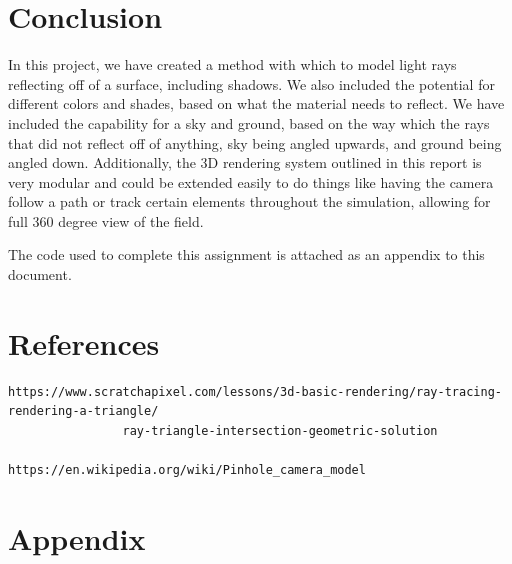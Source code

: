 \documentclass{article}
\begin{document}
\section{Conclusion}
In this project, we have created a method with which to model light rays reflecting off of a surface, including shadows. We also
included the potential for different colors and shades, based on what the material needs to reflect. We have included the capability
for a sky and ground, based on the way which the rays that did not reflect off of anything, sky being angled upwards, and ground
being angled down. Additionally, the 3D rendering system outlined in this report is very modular and could be extended easily to
do things like having the camera follow a path or track certain elements throughout the simulation, allowing for full 360 degree
view of the field.

The code used to complete this assignment is attached as an appendix to this document.

\section{References}
\begin{lstlisting}
https://www.scratchapixel.com/lessons/3d-basic-rendering/ray-tracing-rendering-a-triangle/
                ray-triangle-intersection-geometric-solution

https://en.wikipedia.org/wiki/Pinhole_camera_model
\end{lstlisting}

\newpage
\onecolumn
\section{Appendix}



\end{document}
